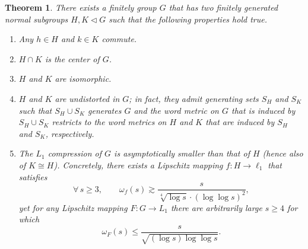 \documentclass[11pt,reqno]{amsart}
\newcommand{\0}{\mathbf{0}}
\renewcommand{\1}{\mathbf 1}
\newcommand{\from}{\colon}
\renewcommand{\ge}{\geqslant}
\renewcommand{\le}{\leqslant}
\newtheorem{thm}{Theorem}[section]
\theoremstyle{remark}
\begin{document}
\begin{thm}\label{thm:permanence} There exists a finitely group $G$  that has two finitely generated normal subgroups $H,K\triangleleft G$ such that the following properties hold true.
\begin{enumerate}
    \item Any $h\in H$ and $k\in K$ commute.
    \item $H\cap K$ is the center of $G$.
    \item $H$ and $K$ are isomorphic.
    \item $H$ and $K$ are undistorted in $G$; in fact, they admit generating sets $S_H$ and $S_K$ such that $S_H\cup S_K$ generates $G$ and the word metric on $G$ that is induced by $S_H\cup S_K$ restricts to the word metrics on $H$ and $K$ that are induced by $S_H$ and $S_K$, respectively.
    \item The $L_1$ compression of $G$ is asymptotically smaller than that of $H$ (hence also of $K\cong H$). Concretely, there exists a Lipschitz mapping $f\from H\to \ell_1$ that satisfies
        \begin{equation}\label{eq:H3 compression}
        \forall\, s\ge 3,\qquad \omega_{f}(s)\gtrsim \frac{s}{\sqrt[4]{\log s}\cdot (\log \log s)^2},
        \end{equation}
        yet for any Lipschitz mapping $F\from G\to L_1$ there are arbitrarily large $s\ge 4$ for which
        \begin{equation}\label{eq:H5 compression}
        \omega_F(s)\le \frac{s}{\sqrt{(\log s)\log\log s}}.
        \end{equation}
\end{enumerate}
\end{thm}
\end{document}

